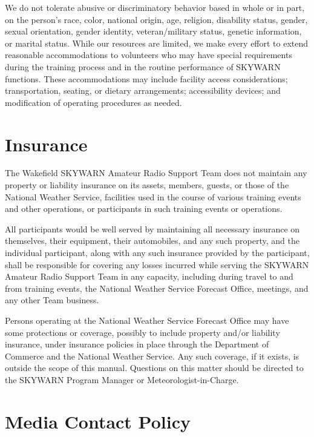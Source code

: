 \documentclass[pdflatex,letterpaper,twoside,12pt]{book}
\begin{document}
We do not tolerate abusive or discriminatory behavior based in whole or in part, on the person's race, color, national origin, age, religion, disability status, gender, sexual orientation, gender identity, veteran/military status, genetic information, or marital status. While our resources are limited, we make every effort to extend reasonable accommodations to volunteers who may have special requirements during the training process and in the routine performance of SKYWARN functions. These accommodations may include facility access considerations; transportation, seating, or dietary arrangements; accessibility devices; and modification of operating procedures as needed.


\section{Insurance}

The Wakefield SKYWARN Amateur Radio Support Team does not maintain any property or liability insurance on its assets, members, guests, or those of the National Weather Service, facilities used in the course of various training events and other operations, or participants in such training events or operations. 

All participants would be well served by maintaining all necessary insurance on themselves, their equipment, their automobiles, and any such property, and the individual participant, along with any such insurance provided by the participant, shall be responsible for covering any losses incurred while serving the SKYWARN Amateur Radio Support Team in any capacity, including during travel to and from training events, the National Weather Service Forecast Office, meetings, and any other Team business. 

Persons operating at the National Weather Service Forecast Office may have some protections or coverage, possibly to include property and/or liability insurance, under insurance policies in place through the Department of Commerce and the National Weather Service.  Any such coverage, if it exists, is outside the scope of this manual.  Questions on this matter should be directed to the SKYWARN Program Manager or Meteorologist-in-Charge.


\section{Media Contact Policy}
\end{document}
